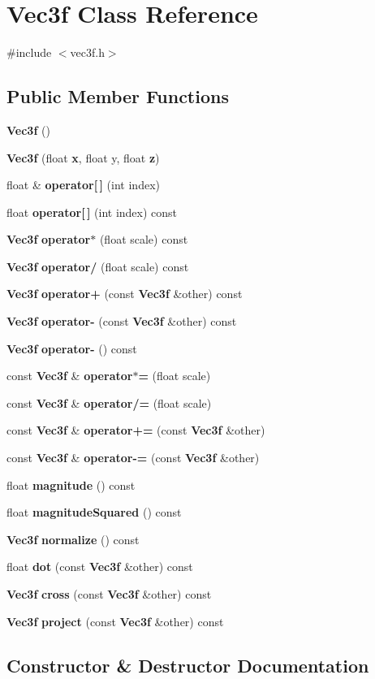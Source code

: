 \section{Vec3f Class Reference}
\label{class_vec3f}


{\ttfamily \#include $<$vec3f.\-h$>$}

\subsection*{Public Member Functions}
\begin{DoxyCompactItemize}
\item 
{\bf Vec3f} ()
\item 
{\bf Vec3f} (float {\bf x}, float y, float {\bf z})
\item 
float \& {\bf operator[$\,$]} (int index)
\item 
float {\bf operator[$\,$]} (int index) const 
\item 
{\bf Vec3f} {\bf operator$\ast$} (float scale) const 
\item 
{\bf Vec3f} {\bf operator/} (float scale) const 
\item 
{\bf Vec3f} {\bf operator+} (const {\bf Vec3f} \&other) const 
\item 
{\bf Vec3f} {\bf operator-\/} (const {\bf Vec3f} \&other) const 
\item 
{\bf Vec3f} {\bf operator-\/} () const 
\item 
const {\bf Vec3f} \& {\bf operator$\ast$=} (float scale)
\item 
const {\bf Vec3f} \& {\bf operator/=} (float scale)
\item 
const {\bf Vec3f} \& {\bf operator+=} (const {\bf Vec3f} \&other)
\item 
const {\bf Vec3f} \& {\bf operator-\/=} (const {\bf Vec3f} \&other)
\item 
float {\bf magnitude} () const 
\item 
float {\bf magnitude\-Squared} () const 
\item 
{\bf Vec3f} {\bf normalize} () const 
\item 
float {\bf dot} (const {\bf Vec3f} \&other) const 
\item 
{\bf Vec3f} {\bf cross} (const {\bf Vec3f} \&other) const 
\item 
{\bf Vec3f} {\bf project} (const {\bf Vec3f} \&other) const 
\end{DoxyCompactItemize}


\subsection{Constructor \& Destructor Documentation}
